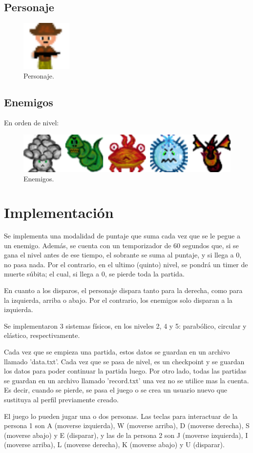 \documentclass{article}
\begin{document}
\newpage
\subsection{Personaje}
\begin{figure}[h]
\includegraphics[width=2.5cm]{imagenes/PERSONAJE.png}
\centering
\caption{Personaje.}
\end{figure}

\subsection{Enemigos}
\par En orden de nivel:
\begin{figure}[h]
\includegraphics[width=12cm]{imagenes/villanos.png}
\centering
\caption{Enemigos.}
\end{figure}

\section{Implementación}
\par Se implementa una modalidad de puntaje que suma cada vez que se le pegue a un enemigo. Además, se cuenta con un temporizador de 60 segundos que, si se gana el nivel antes de ese tiempo, el sobrante se suma al puntaje, y si llega a 0, no pasa nada. Por el contrario, en el ultimo (quinto) nivel, se pondrá un timer de muerte súbita; el cual, si llega a 0, se pierde toda la partida.
\par En cuanto a los disparos, el personaje dispara tanto para la derecha, como para la izquierda, arriba o abajo. Por el contrario, los enemigos solo disparan a la izquierda.
\par Se implementaron 3 sistemas físicos, en los niveles 2, 4 y 5: parabólico, circular y elástico, respectivamente.
\par Cada vez que se empieza una partida, estos datos se guardan en un archivo llamado 'data.txt'. Cada vez que se pasa de nivel, es un checkpoint y se guardan los datos para poder continuar la partida luego. Por otro lado, todas las partidas se guardan en un archivo llamado 'record.txt' una vez no se utilice mas la cuenta. Es decir, cuando se pierde, se pasa el juego o se crea un usuario nuevo que sustituya al perfil previamente creado.
\par El juego lo pueden jugar una o dos personas. Las teclas para interactuar de la persona 1 son A (moverse izquierda), W (moverse arriba), D (moverse derecha), S (moverse abajo) y E (disparar), y las de la persona 2 son J (moverse izquierda), I (moverse arriba), L (moverse derecha), K (moverse abajo) y U (disparar).
\end{document}
